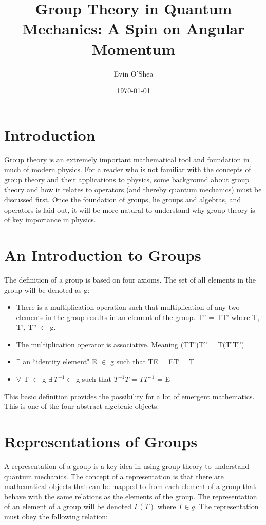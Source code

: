 \documentclass{article}
\title{Group Theory in Quantum Mechanics: A Spin on Angular Momentum}
\author{Evin O'Shea }
\date{\today}
\begin{document}
\maketitle


\section{Introduction}
Group theory is an extremely important mathematical tool and foundation in much of modern physics. For a reader who is not familiar with the concepts of group theory and their applications to physics, some background about group theory and how it relates to operators (and thereby quantum mechanics) must be discussed first. Once the foundation of groups, lie groups and algebras, and operators is laid out, it will be more natural to understand why group theory is of key importance in physics.

\section{An Introduction to Groups}

The definition of a group is based on four axioms. The set of all elements in the group will be denoted as g:

\begin{itemize}
\item There is a multiplication operation such that multiplication of any two elements in the group results in an element of the group. T'' = TT' where T, T', T'' $\in$ g.
\item The multiplication operator is associative. Meaning (TT')T'' = T(T'T'').
\item $\exists$ an ``identity element" E $\in$ g such that TE = ET = T
\item $\forall$ T $\in$ g $\exists\: T^{-1} \in$ g such that $T^{-1}T$ = $TT^{-1}$ = E
\end{itemize} 

This basic definition provides the possibility for a lot of emergent mathematics. This is one of the four abstract algebraic objects. 

\section{Representations of Groups}
A representation of a group is a key idea in using group theory to understand quantum mechanics. The concept of a representation is that there are mathematical objects that can be mapped to from each element of a group that behave with the same relations as the elements of the group. The representation of an element of a group will be denoted $\Gamma (T)$ where $T \in g$. The representation must obey the following relation:
\end{document}

